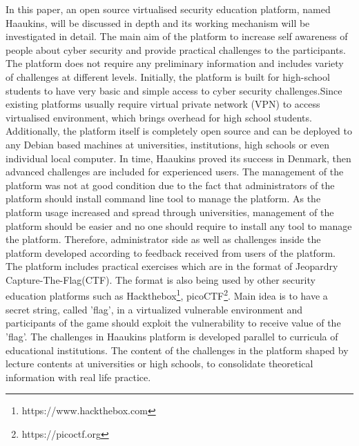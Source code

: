 In this paper, an open source virtualised security education platform, named Haaukins, will be discussed in depth and its working mechanism will be investigated in detail. The main aim of the platform to increase self awareness of people about cyber security and provide practical challenges to the participants. The platform does not require any preliminary information and includes variety of challenges at different levels.
Initially, the platform is built for high-school students to have very basic and simple access to cyber security challenges.Since existing platforms usually require virtual private network (VPN) to access virtualised environment, which brings overhead for high school students. Additionally, the platform itself is completely open source and can be deployed to any Debian based machines at universities, institutions, high schools or even individual local computer. In time, Haaukins proved its success in Denmark, then advanced challenges are included for experienced users. The management of the platform was not at good condition due to the fact that administrators of the platform should install command line tool to manage the platform. As the platform usage increased and spread through universities, management of the platform should be easier and no one should require to install any tool to manage the platform. Therefore, administrator side as well as challenges inside the platform developed according to feedback received from users of the platform. The platform includes practical exercises which are in the format of Jeopardry Capture-The-Flag(CTF).\cite{191767} The format is also being used by other security education platforms  such as Hackthebox\footnote{https://www.hackthebox.com}, picoCTF\footnote{https://picoctf.org}. Main idea is to have a secret string, called 'flag', in a virtualized vulnerable environment and participants of the game should exploit the vulnerability to receive value of  the 'flag'. The challenges in Haaukins platform is developed parallel to curricula of educational institutions. The content of the challenges in the platform shaped by lecture contents at universities or high schools, to consolidate theoretical information with real life practice. 







